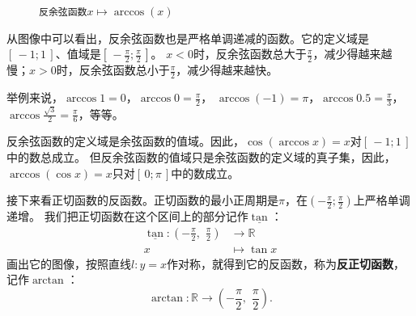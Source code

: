 \documentclass[12pt,UTF8]{ctexbook}
\begin{document}
\begin{figure}[h]
    \caption*{\texttt{反余弦函数}$x\mapsto \arccos(x)$}
\end{figure}

从图像中可以看出，反余弦函数也是严格单调递减的函数。它的定义域是$[\,-1; 1\,]$、值域是$[\,-\frac{\pi}{2}; \frac{\pi}{2}\,]$。
$x < 0$时，反余弦函数总大于$\frac{\pi}{2}$，减少得越来越慢；$x > 0$时，反余弦函数总小于$\frac{\pi}{2}$，减少得越来越快。

举例来说，$\arccos{1} = 0$，$\arccos{0} = \frac{\pi}{2}$，
$\arccos{(-1)} = \pi$，$\arccos{0.5} = \frac{\pi}{3}$，$\arccos{\frac{\sqrt{3}}{2}} = \frac{\pi}{6}$，等等。

反余弦函数的定义域是余弦函数的值域。因此，$\cos{(\arccos{x})} = x$对$[\,-1; 1\,]$中的数总成立。
但反余弦函数的值域只是余弦函数的定义域的真子集，因此，$\arccos{(\cos{x})} = x$只对$[\,0;\pi\,]$中的数成立。

接下来看正切函数的反函数。正切函数的最小正周期是$\pi$，在$(-\frac{\pi}{2}; \frac{\pi}{2})$上严格单调递增。
我们把正切函数在这个区间上的部分记作$\underline{\tan}$：
\begin{align*}
    \underline{\tan} : (-\frac{\pi}{2}, \,\, \frac{\pi}{2}) &\rightarrow \mathbb{R}  \\
                                                          x &\mapsto \tan{x} 
\end{align*}
画出它的图像，按照直线$l: y = x$作对称，就得到它的反函数，称为\textbf{反正切函数}，记作$\arctan$：
$$ \arctan : \mathbb{R} \rightarrow (-\frac{\pi}{2}, \,\, \frac{\pi}{2}) . $$
\end{document}
